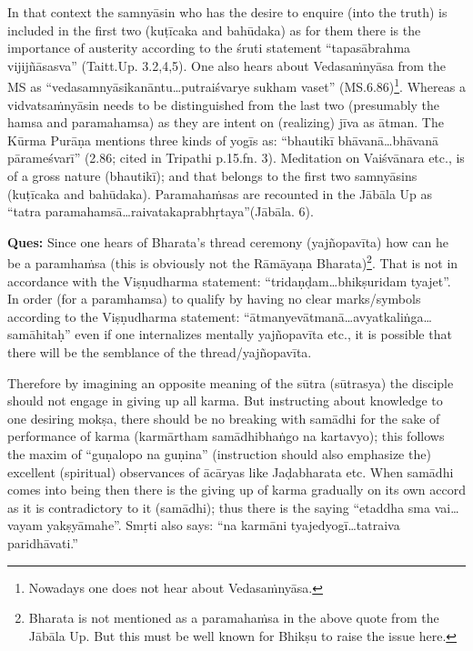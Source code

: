 In that context the samnyāsin who has the desire to enquire (into the truth) is included in the first two (kuṭīcaka and bahūdaka) as for them there is the importance of austerity according to the śruti statement “tapasābrahma vijijñāsasva” (Taitt.Up. 3.2,4,5). One also hears about Vedasaṁnyāsa from the MS as “vedasamnyāsikanāntu…putraiśvarye sukham vaset” (MS.6.86)\footnote{Nowadays one does not hear about Vedasaṁnyāsa.}. Whereas a vidvatsaṁnyāsin needs to be distinguished from the last two (presumably the hamsa and paramahamsa) as they are intent on (realizing) jīva as ātman. The Kūrma Purāṇa mentions three kinds of yogīs as:  “bhautikī bhāvanā…bhāvanā pārameśvarī” (2.86; cited in Tripathi p.15.fn. 3). Meditation on Vaiśvānara etc., is of a gross nature (bhautikī); and that belongs to the first two samnyāsins (kuṭīcaka and bahūdaka). Paramahaṁsas are recoun\-ted in the Jābāla Up as “tatra paramahamsā…raivatakaprabhṛtaya”\break (Jābāla. 6).

\textbf{Ques:} Since one hears of Bharata’s thread ceremony (yajñopavīta) how can he be a paramhaṁsa (this is obviously not the Rāmāyaṇa Bharata)\footnote{Bharata is not mentioned as a paramahaṁsa in the above quote from the Jābāla Up. But this must be well known for Bhikṣu to raise the issue here.}. That is not in accordance with the Viṣṇudharma statement:  “tridaṇ\-ḍam…bhikṣuridam tyajet”. In order (for a paramhamsa) to qualify by having no clear marks/symbols according to the Viṣṇudharma  statement: “ātmanyevātmanā…avyatkaliṅga…samāhitaḥ” even if one internalizes mentally yajñopavīta etc., it is possible that there will be the semblance of the thread/yajñopavīta.

Therefore by imagining an opposite meaning of the sūtra (sūtrasya) the disciple should not engage in giving up all karma. But instructing about knowledge to one desiring mokṣa, there should be no breaking with samādhi for the sake of performance of karma (karmārtham samādhibhaṅgo na kartavyo); this follows the maxim of “guṇalopo na guṇina” (instruction should also emphasize the) excellent (spiritual) observances of ācāryas like Jaḍabharata etc. When samādhi comes into being then there is the giving up of karma gradually on its own accord as it is contradictory to it (samādhi); thus there is the saying “etaddha sma vai…vayam yakṣyāmahe”. Smṛti also says: “na karmāni tyajedyogī…tatraiva paridhāvati.”


